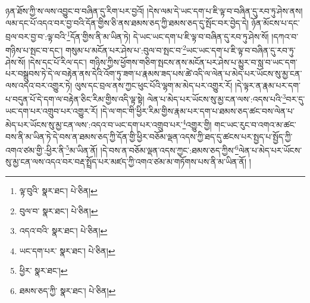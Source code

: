 ཉན་ཐོས་ཀྱི་ས་ལས་འབྱུང་བ་བཞིན་དུ་རིག་པར་བྱའོ། །དེས་ལམ་དེ་ཡང་དག་པ་ཇི་ལྟ་བ་བཞིན་དུ་རབ་ཏུ་ཤེས་ནས། ལམ་དང་པོ་འདའ་བར་བྱ་བའི་དོན་གྱིས་ཅི་ནས་ཐམས་ཅད་ཀྱི་ཐམས་ཅད་དུ་སྤོང་བར་བྱེད་དེ། ཉོན་མོངས་པ་དང་བྲལ་བར་བྱ་བ་:ལྟ་བའི་\footnote{ལྟ་བུའི་  སྣར་ཐང་།  པེ་ཅིན། }དོན་གྱིས་ནི་མ་ཡིན་ཏེ། དེ་ཡང་ཡང་དག་པ་ཇི་ལྟ་བ་བཞིན་དུ་རབ་ཏུ་ཤེས་སོ། །དཀའ་བ་གཉིས་པ་སྤང་བ་དང་། གསུམ་པ་མངོན་པར་ཤེས་པ་:བུལ་བ་སྤང་བ་\footnote{བུལ་བ་  སྣར་ཐང་།  པེ་ཅིན། }ཡང་ཡང་དག་པ་ཇི་ལྟ་བ་བཞིན་དུ་རབ་ཏུ་ཤེས་སོ། །དེས་དང་པོ་རིལ་དང་། གཉིས་ཀྱིས་ཕྱོགས་གཅིག་སྤངས་ནས་མངོན་པར་ཤེས་པ་མྱུར་བ་སླ་བ་ཡང་དག་པར་བསྒྲུབས་ཏེ་དེ་ལ་བརྟེན་ནས་དེའི་འོག་ཏུ་ཟག་པ་རྣམས་ཟད་པས་ཚེ་འདི་ལ་ལེན་པ་མེད་པར་ཡོངས་སུ་མྱ་ངན་ལས་འདའ་བར་འགྱུར་ཏེ། ལུས་དང་བྲལ་ནས་ཀྱང་ཕུང་པོའི་ལྷག་མ་མེད་པར་འགྱུར་རོ། །དེ་ལྟར་ན་རྣམ་པར་དག་པ་བདུན་པོ་དེ་དག་ལ་བརྟེན་ཅིང་རིམ་གྱིས་འདི་ལྟ་སྟེ། ལེན་པ་མེད་པར་ཡོངས་སུ་མྱ་ངན་ལས་:འདས་པའི་\footnote{འདའ་བའི་  སྣར་ཐང་།  པེ་ཅིན། }བར་དུ་ཡང་དག་པར་འགྲུབ་པར་འགྱུར་རོ། །དེ་ལ་གང་གི་ཕྱིར་རིམ་གྱིས་རྣམ་པར་དག་པ་ཐམས་ཅད་ཚང་བས་ལེན་པ་མེད་པར་ཡོངས་སུ་མྱ་ངན་ལས་:འདའ་བ་ཡང་དག་པར་འགྲུབ་པར་\footnote{ཡང་དག་པར་  སྣར་ཐང་།  པེ་ཅིན། }འགྱུར་གྱི། གང་ཡང་རུང་བ་འགའ་མ་ཚང་བས་ནི་མ་ཡིན་ཏེ་དེ་བས་ན་ཐམས་ཅད་ཀྱི་དོན་གྱི་ཕྱིར་བཅོམ་ལྡན་འདས་ཀྱི་ཐད་དུ་ཚངས་པར་སྤྱད་པ་སྤྱོད་ཀྱི་འགའ་ཙམ་གྱི་:ཕྱིར་ནི་\footnote{ཕྱིར་  སྣར་ཐང་། }མ་ཡིན་ནོ། །དེ་བས་ན་བཅོམ་ལྡན་འདས་ཀྱང་:ཐམས་ཅད་ཀྱིས་\footnote{ཐམས་ཅད་ཀྱི་  སྣར་ཐང་།  པེ་ཅིན། }ལེན་པ་མེད་པར་ཡོངས་སུ་མྱ་ངན་ལས་འདའ་བར་བརྡ་སྤྲོད་པར་མཛད་ཀྱི་འགའ་ཙམ་མ་གཏོགས་པས་ནི་མ་ཡིན་ནོ། །
